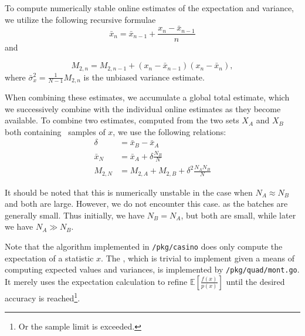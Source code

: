 \documentclass[10pt, a4paper]{article}
\begin{document}

  To compute numerically stable online estimates of the expectation and variance, we utilize the
  following recursive formulae
  \begin{equation}
  \bar{x}_n = \bar{x}_{n-1} + \frac{x_n - \bar{x}_{n-1}}{n}
  \end{equation}
  and

  \begin{equation}
  M_{2,n} = M_{2,n-1} + (x_n - \bar{x}_{n-1})(x_n - \bar{x}_n),
  \end{equation}
  where $\bar{\sigma}_x^2 = \frac{1}{N-1} M_{2,n}$ is the unbiased variance estimate\cite{welford}.

  When combining these estimates, we accumulate a global total estimate, which we successively combine
  with the individual online estimates as they become available. To combine two estimates, computed
  from the two sets $X_A$ and $X_B$ both containing \iid{} samples of $x$, we use the following relations\cite{chan}:
  \begin{equation}
  \begin{split}
  \delta & = \bar{x}_B - \bar{x}_A \\
  \bar{x}_N & = \bar{x}_A + \delta \frac{N_B}{N} \\
  M_{2,N} & = M_{2,A} + M_{2,B} + \delta^2 \frac{N_A N_B}{N}
  \end{split}
  \end{equation}

  It should be noted that this is numerically unstable in the case when $N_A \approx N_B$ and both
  are large\cite{chan}. However, we do not encounter this case. as the batches are generally small.
  Thus initially, we have $N_B = N_A$, but both are small, while later we have $N_A \gg N_B$.

  Note that the algorithm implemented in \texttt{/pkg/casino} does only compute the expectation of a
  statistic $x$. The \is{}, which is trivial to implement given a means of computing
  expected values and variances, is implemented by \texttt{/pkg/quad/mont.go}. It merely uses the
  expectation calculation to refine $\mathbb{E}\left[ \frac{f(x)}{p(x)} \right]$ until the desired
  accuracy is reached\footnote{Or the sample limit is exceeded.}.
\end{document}
